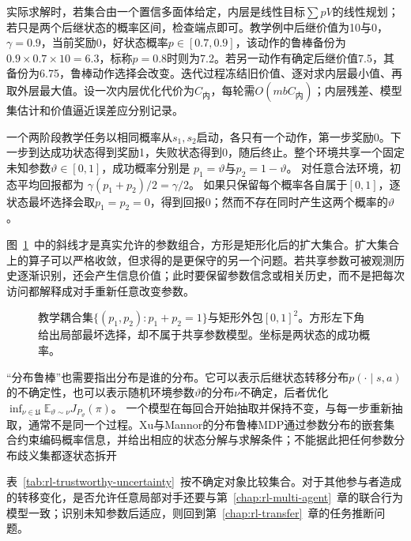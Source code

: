 实际求解时，若集合由一个置信多面体给定，内层是线性目标$\sum pV$的线性规划；若只是两个后继状态的概率区间，检查端点即可。教学例中后继价值为10与0，$\gamma=0.9$，当前奖励0，好状态概率$p\in[0.7,0.9]$，该动作的鲁棒备份为$0.9\times0.7\times10=6.3$，标称$p=0.8$时则为7.2。若另一动作有确定后继价值7.5，其备份为6.75，鲁棒动作选择会改变。迭代过程冻结旧价值、逐对求内层最小值、再取外层最大值。设一次内层优化代价为$C_{\text{内}}$，每轮需$O(mbC_{\text{内}})$；内层残差、模型集估计和价值逼近误差应分别记录。

\begin{example}[共享参数不能随状态独立取坏值]
  \label{ex:rl-trustworthy-coupling}
  一个两阶段教学任务以相同概率从$s_1,s_2$启动，各只有一个动作，第一步奖励0。下一步到达成功状态得到奖励1，失败状态得到0，随后终止。整个环境共享一个固定未知参数$\vartheta\in[0,1]$，成功概率分别是
  $p_1=\vartheta$与$p_2=1-\vartheta$。
  对任意合法环境，初态平均回报都为
  $\gamma(p_1+p_2)/2=\gamma/2$。
  如果只保留每个概率各自属于$[0,1]$，逐状态最坏选择会取$p_1=p_2=0$，得到回报0；然而不存在同时产生这两个概率的$\vartheta$。
\end{example}

图~\ref{fig:rl-trustworthy-rectangular}~中的斜线才是真实允许的参数组合，方形是矩形化后的扩大集合。扩大集合上的算子可以严格收敛，但求得的是更保守的另一个问题。若共享参数可被观测历史逐渐识别，还会产生信息价值；此时要保留参数信念或相关历史，而不是把每次访问都解释成对手重新任意改变参数。

\begin{figure}[htbp]
  \centering
  
  \caption{教学耦合集$\{(p_1,p_2):p_1+p_2=1\}$与矩形外包$[0,1]^2$。方形左下角给出局部最坏选择，却不属于共享参数模型。坐标是两状态的成功概率。}
  \label{fig:rl-trustworthy-rectangular}
\end{figure}

“分布鲁棒”也需要指出分布是谁的分布。它可以表示后继状态转移分布$p(\cdot\mid s,a)$的不确定性，也可以表示随机环境参数$\vartheta$的分布$\nu$不确定，后者优化
$\inf_{\nu\in\mathfrak U}\mathbb E_{\vartheta\sim\nu}J_{P_\vartheta}(\pi)$。
一个模型在每回合开始抽取并保持不变，与每一步重新抽取，通常不是同一个过程。Xu与Mannor的分布鲁棒MDP通过参数分布的嵌套集合约束编码概率信息，并给出相应的状态分解与求解条件；不能据此把任何参数分布歧义集都逐状态拆开

表~\ref{tab:rl-trustworthy-uncertainty}~按不确定对象比较集合。对于其他参与者造成的转移变化，是否允许任意局部对手还要与第~\ref{chap:rl-multi-agent}~章的联合行为模型一致；识别未知参数后适应，则回到第~\ref{chap:rl-transfer}~章的任务推断问题。

